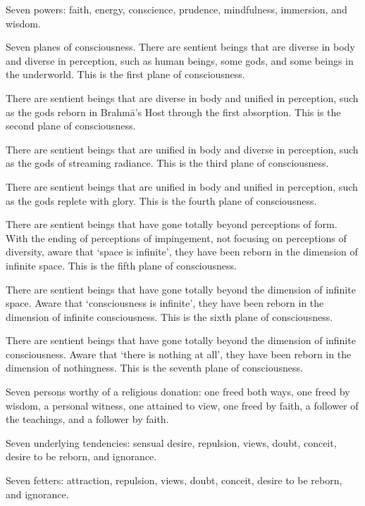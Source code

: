 \documentclass[12pt,openany]{book}%
\begin{document}
Seven powers: faith, energy, conscience, prudence, mindfulness, immersion, and wisdom. 

Seven planes of consciousness. There are sentient beings that are diverse in body and diverse in perception, such as human beings, some gods, and some beings in the underworld. This is the first plane of consciousness. 

There are sentient beings that are diverse in body and unified in perception, such as the gods reborn in \textsanskrit{Brahmā}’s Host through the first absorption. This is the second plane of consciousness. 

There are sentient beings that are unified in body and diverse in perception, such as the gods of streaming radiance. This is the third plane of consciousness. 

There are sentient beings that are unified in body and unified in perception, such as the gods replete with glory. This is the fourth plane of consciousness. 

There are sentient beings that have gone totally beyond perceptions of form. With the ending of perceptions of impingement, not focusing on perceptions of diversity, aware that ‘space is infinite’, they have been reborn in the dimension of infinite space. This is the fifth plane of consciousness. 

There are sentient beings that have gone totally beyond the dimension of infinite space. Aware that ‘consciousness is infinite’, they have been reborn in the dimension of infinite consciousness. This is the sixth plane of consciousness. 

There are sentient beings that have gone totally beyond the dimension of infinite consciousness. Aware that ‘there is nothing at all’, they have been reborn in the dimension of nothingness. This is the seventh plane of consciousness. 

Seven persons worthy of a religious donation: one freed both ways, one freed by wisdom, a personal witness, one attained to view, one freed by faith, a follower of the teachings, and a follower by faith. 

Seven underlying tendencies: sensual desire, repulsion, views, doubt, conceit, desire to be reborn, and ignorance. 

Seven fetters: attraction, repulsion, views, doubt, conceit, desire to be reborn, and ignorance. 
\end{document}
